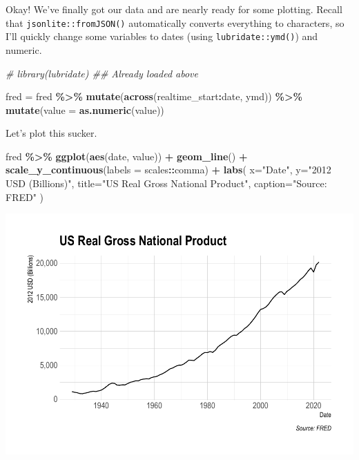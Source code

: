 \documentclass[
]{article}
\newenvironment{Shaded}{\begin{snugshade}}{\end{snugshade}}
\newcommand{\AttributeTok}[1]{\textcolor[rgb]{0.13,0.29,0.53}{#1}}
\newcommand{\CommentTok}[1]{\textcolor[rgb]{0.56,0.35,0.01}{\textit{#1}}}
\newcommand{\FunctionTok}[1]{\textcolor[rgb]{0.13,0.29,0.53}{\textbf{#1}}}
\newcommand{\NormalTok}[1]{#1}
\newcommand{\OtherTok}[1]{\textcolor[rgb]{0.56,0.35,0.01}{#1}}
\newcommand{\SpecialCharTok}[1]{\textcolor[rgb]{0.81,0.36,0.00}{\textbf{#1}}}
\newcommand{\StringTok}[1]{\textcolor[rgb]{0.31,0.60,0.02}{#1}}
\begin{document}
Okay! We've finally got our data and are nearly ready for some plotting.
Recall that \texttt{jsonlite::fromJSON()} automatically converts
everything to characters, so I'll quickly change some variables to dates
(using \texttt{lubridate::ymd()}) and numeric.

\begin{Shaded}
\begin{Highlighting}[]
\CommentTok{\# library(lubridate) \#\# Already loaded above}

\NormalTok{fred }\OtherTok{=}
\NormalTok{  fred }\SpecialCharTok{\%\textgreater{}\%}
  \FunctionTok{mutate}\NormalTok{(}\FunctionTok{across}\NormalTok{(realtime\_start}\SpecialCharTok{:}\NormalTok{date, ymd)) }\SpecialCharTok{\%\textgreater{}\%}
  \FunctionTok{mutate}\NormalTok{(}\AttributeTok{value =} \FunctionTok{as.numeric}\NormalTok{(value)) }
\end{Highlighting}
\end{Shaded}

Let's plot this sucker.

\begin{Shaded}
\begin{Highlighting}[]
\NormalTok{fred }\SpecialCharTok{\%\textgreater{}\%}
  \FunctionTok{ggplot}\NormalTok{(}\FunctionTok{aes}\NormalTok{(date, value)) }\SpecialCharTok{+}
  \FunctionTok{geom\_line}\NormalTok{() }\SpecialCharTok{+}
  \FunctionTok{scale\_y\_continuous}\NormalTok{(}\AttributeTok{labels =}\NormalTok{ scales}\SpecialCharTok{::}\NormalTok{comma) }\SpecialCharTok{+}
  \FunctionTok{labs}\NormalTok{(}
    \AttributeTok{x=}\StringTok{"Date"}\NormalTok{, }\AttributeTok{y=}\StringTok{"2012 USD (Billions)"}\NormalTok{,}
    \AttributeTok{title=}\StringTok{"US Real Gross National Product"}\NormalTok{, }\AttributeTok{caption=}\StringTok{"Source: FRED"}
\NormalTok{    )}
\end{Highlighting}
\end{Shaded}

\includegraphics{07-web-apis_files/figure-latex/fred6-1.pdf}
\end{document}
